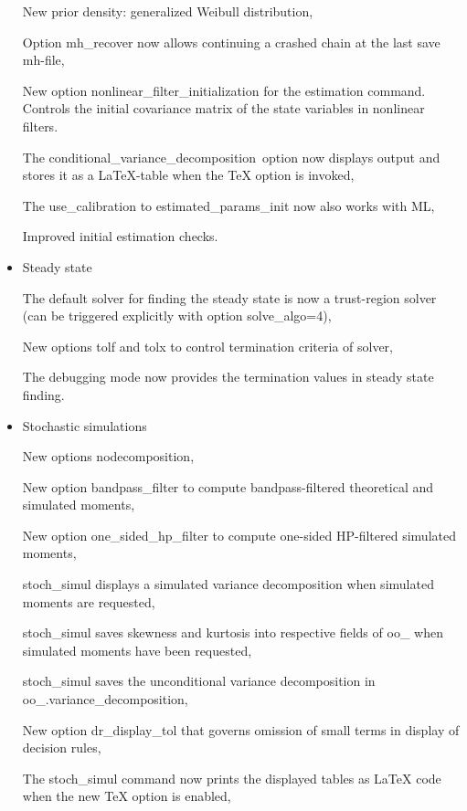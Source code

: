 \documentclass[10pt,math=newtx,citestyle=gb7714-2015,bibstyle=gb7714-2015]{elegantbook}
\begin{document}
\begin{itemize}
		
		New prior density: generalized Weibull distribution,
		
		
		Option mh\_recover now allows continuing a crashed chain at the last save mh-file,
		
		
		New option nonlinear\_filter\_initialization for the estimation command. Controls the initial covariance matrix of the state variables in nonlinear filters.
		
		
		The conditional\_variance\_decomposition option now displays output and stores it as a LaTeX-table when the TeX option is invoked,
		
		
		The use\_calibration to estimated\_params\_init now also works with ML,
		
		
		Improved initial estimation checks.
		
		
		
		
		\item Steady state
		
		
		The default solver for finding the steady state is now a trust-region solver (can be triggered explicitly with option
		solve\_algo=4),
		
		
		New options tolf and tolx to control termination criteria of solver,
		
		
		The debugging mode now provides the termination values in steady state finding.
		
		
		
		
		\item Stochastic simulations
		
		
		New options nodecomposition,
		
		
		New option bandpass\_filter to compute bandpass-filtered theoretical and simulated moments,
		
		
		New option one\_sided\_hp\_filter to compute one-sided HP-filtered simulated moments,
		
		
		stoch\_simul displays a simulated variance decomposition when simulated moments are requested,
		
		
		stoch\_simul saves skewness and kurtosis into respective fields of oo\_ when simulated moments have been requested,
		
		
		stoch\_simul saves the unconditional variance decomposition in oo\_.variance\_decomposition,
		
		
		New option dr\_display\_tol that governs omission of small terms in display of decision rules,
		
		
		The stoch\_simul command now prints the displayed tables as LaTeX code when the new TeX option is enabled,
		

\end{itemize}
\end{document}

